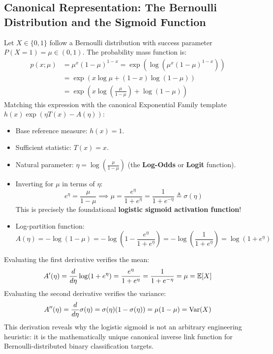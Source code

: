 \subsection{Canonical Representation: The Bernoulli Distribution and the Sigmoid Function}
Let $X \in \{0, 1\}$ follow a Bernoulli distribution with success parameter $P(X = 1) = \mu \in (0, 1)$. The probability mass function is:
\begin{align}
p(x; \mu) &= \mu^x (1 - \mu)^{1 - x} = \exp\left( \log\left( \mu^x (1 - \mu)^{1 - x} \right) \right) \nonumber \\
&= \exp\left( x \log\mu + (1 - x)\log(1 - \mu) \right) \nonumber \\
&= \exp\left( x \log\left(\frac{\mu}{1 - \mu}\right) + \log(1 - \mu) \right)
\end{align}
Matching this expression with the canonical Exponential Family template $h(x) \exp\left( \eta T(x) - A(\eta) \right)$:
\begin{itemize}
    \item Base reference measure: $h(x) = 1$.
    \item Sufficient statistic: $T(x) = x$.
    \item Natural parameter: $\eta = \log\left(\frac{\mu}{1 - \mu}\right)$ (the \textbf{Log-Odds} or \textbf{Logit} function).
    \item Inverting for $\mu$ in terms of $\eta$:
    \begin{equation}
    e^\eta = \frac{\mu}{1 - \mu} \implies \mu = \frac{e^\eta}{1 + e^\eta} = \frac{1}{1 + e^{-\eta}} \triangleq \sigma(\eta)
    \end{equation}
    This is precisely the foundational \textbf{logistic sigmoid activation function}!
    \item Log-partition function:
    \begin{equation}
    A(\eta) = -\log(1 - \mu) = -\log\left(1 - \frac{e^\eta}{1 + e^\eta}\right) = -\log\left(\frac{1}{1 + e^\eta}\right) = \log(1 + e^\eta)
    \end{equation}
\end{itemize}
Evaluating the first derivative verifies the mean:
\begin{equation}
A'(\eta) = \frac{d}{d\eta} \log(1 + e^\eta) = \frac{e^\eta}{1 + e^\eta} = \frac{1}{1 + e^{-\eta}} = \mu = \operatorname{\mathbb{E}}[X]
\end{equation}
Evaluating the second derivative verifies the variance:
\begin{equation}
A''(\eta) = \frac{d}{d\eta} \sigma(\eta) = \sigma(\eta)(1 - \sigma(\eta)) = \mu(1 - \mu) = \operatorname{Var}(X)
\end{equation}
This derivation reveals why the logistic sigmoid is not an arbitrary engineering heuristic: it is the mathematically unique canonical inverse link function for Bernoulli-distributed binary classification targets.

